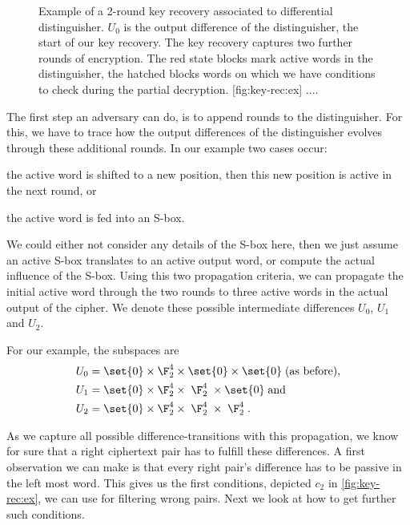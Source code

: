 \begin{figure}[t]
    \begin{sidecaption}{%
            Example of a 2-round key recovery associated to differential distinguisher.
            $U_0$ is the output difference of the distinguisher, the start of our key recovery.
            The key recovery captures two further rounds of encryption.
            The red state blocks mark active words in the distinguisher, the hatched blocks words on which we have conditions to check during the partial decryption.
    }[fig:key-rec:ex]
    \centering
    ....
    \end{sidecaption}
\end{figure}

The first step an adversary can do, is to append rounds to the distinguisher.
For this, we have to trace how the output differences of the distinguisher evolves through these additional rounds.
In our example two cases occur: \begin{inparaenum}
\item the active word is shifted to a new position, then this new position is active in the next round, or
\item the active word is fed into an S-box.
\end{inparaenum}
We could either not consider any details of the S-box here, then we just assume an active S-box translates to an active output word, or compute the actual influence of the S-box.
Using this two propagation criteria, we can propagate the initial active word through the two rounds to three active words in the actual output of the cipher.
We denote these possible intermediate differences $U_0$, $U_1$ and $U_2$.

For our example, the subspaces are
\begin{align*}
    U_0 &= \set{0} \times \F_2^4 \times \set{0} \times \set{0}\;\text{(as before)},\\
    U_1 &= \set{0} \times \F_2^4 \times \;\F_2^4\; \times \set{0}\;\text{and}\\
    U_2 &= \set{0} \times \F_2^4 \times \;\F_2^4\; \times \;\F_2^4\;.
\end{align*}

As we capture all possible difference-transitions with this propagation, we know for sure that a right ciphertext pair has to fulfill these differences.
A first observation we can make is that every right pair's difference has to be passive in the left most word.
This gives us the first conditions, depicted $c_2$ in \cref{fig:key-rec:ex}, we can use for filtering wrong pairs.
Next we look at how to get further such conditions.

